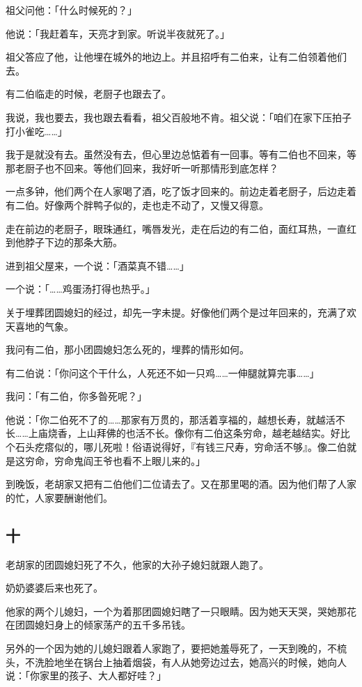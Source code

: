 \documentclass[UTF8]{ctexart}
\begin{document}
祖父问他：「什么时候死的？」

他说：「我赶着车，天亮才到家。听说半夜就死了。」

祖父答应了他，让他埋在城外的地边上。并且招呼有二伯来，让有二伯领着他们去。

有二伯临走的时候，老厨子也跟去了。

我说，我也要去，我也跟去看看，祖父百般地不肯。祖父说：「咱们在家下压拍子打小雀吃……」

我于是就没有去。虽然没有去，但心里边总惦着有一回事。等有二伯也不回来，等那老厨子也不回来。等他们回来，我好听一听那情形到底怎样？

一点多钟，他们两个在人家喝了酒，吃了饭才回来的。前边走着老厨子，后边走着有二伯。好像两个胖鸭子似的，走也走不动了，又慢又得意。

走在前边的老厨子，眼珠通红，嘴唇发光，走在后边的有二伯，面红耳热，一直红到他脖子下边的那条大筋。

进到祖父屋来，一个说：「酒菜真不错……」

一个说：「……鸡蛋汤打得也热乎。」

关于埋葬团圆媳妇的经过，却先一字未提。好像他们两个是过年回来的，充满了欢天喜地的气象。

我问有二伯，那小团圆媳妇怎么死的，埋葬的情形如何。

有二伯说：「你问这个干什么，人死还不如一只鸡……一伸腿就算完事……」

我问：「有二伯，你多昝死呢？」

他说：「你二伯死不了的……那家有万贯的，那活着享福的，越想长寿，就越活不长……上庙烧香，上山拜佛的也活不长。像你有二伯这条穷命，越老越结实。好比个石头疙瘩似的，哪儿死啦！俗语说得好，『有钱三尺寿，穷命活不够』。像二伯就是这穷命，穷命鬼阎王爷也看不上眼儿来的。」

到晚饭，老胡家又把有二伯他们二位请去了。又在那里喝的酒。因为他们帮了人家的忙，人家要酬谢他们。

\subsection{十}

老胡家的团圆媳妇死了不久，他家的大孙子媳妇就跟人跑了。

奶奶婆婆后来也死了。

他家的两个儿媳妇，一个为着那团圆媳妇瞎了一只眼睛。因为她天天哭，哭她那花在团圆媳妇身上的倾家荡产的五千多吊钱。

另外的一个因为她的儿媳妇跟着人家跑了，要把她羞辱死了，一天到晚的，不梳头，不洗脸地坐在锅台上抽着烟袋，有人从她旁边过去，她高兴的时候，她向人说：「你家里的孩子、大人都好哇？」
\end{document}
